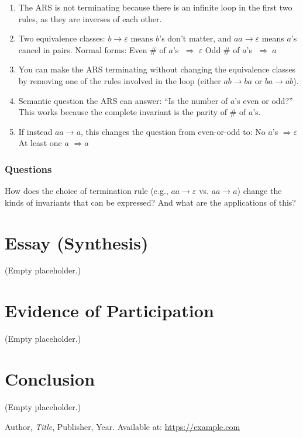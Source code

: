 \documentclass{article}
\theoremstyle{theorem}
\theoremstyle{definition}
\theoremstyle{remark}
\begin{document}
\begin{enumerate}
  \item The ARS is not terminating because there is an infinite loop in the first two rules, as they are inverses of each other.

  \item Two equivalence classes: $b \to \varepsilon$ means $b$’s don’t matter, and $aa \to \varepsilon$ means $a$’s cancel in pairs.  
  Normal forms:  
  Even \# of $a$’s $\;\Rightarrow\; \varepsilon$  
  Odd \# of $a$’s $\;\Rightarrow\; a$

  \item You can make the ARS terminating without changing the equivalence classes by removing one of the rules involved in the loop (either $ab \to ba$ or $ba \to ab$).

  \item Semantic question the ARS can answer: “Is the number of $a$’s even or odd?” This works because the complete invariant is the parity of \# of $a$’s.

  \item If instead $aa \to a$, this changes the question from even-or-odd to:  
  No $a$’s $\Rightarrow \varepsilon$  
  At least one $a$ $\Rightarrow a$
\end{enumerate}

\subsubsection{Questions}
How does the choice of termination rule (e.g., $aa \to \varepsilon$ vs. $aa \to a$) change the kinds of invariants that can be expressed? And what are the applications of this?

\section{Essay (Synthesis)}
(Empty placeholder.)

\section{Evidence of Participation}
(Empty placeholder.)

\section{Conclusion}\label{conclusion}
(Empty placeholder.)

\begin{thebibliography}{99}
 Author, \emph{Title}, Publisher, Year. Available at: \url{https://example.com}
\end{thebibliography}
\end{document}
